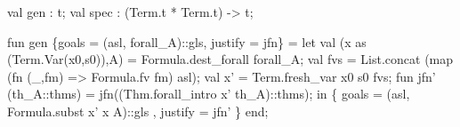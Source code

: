 
\nwenddocs{}\plusendmoddef\nwstartdeflinemarkup{}\nwenddeflinemarkup
val gen : t;
val spec : (Term.t * Term.t) -> t;
\nwendcode{}\nwdocspar

\nwenddocs{}\plusendmoddef\nwstartdeflinemarkup{}\nwenddeflinemarkup
fun gen \{goals = (asl, forall_A)::gls, justify = jfn\} =
  let
    val (x as (Term.Var(x0,s0)),A) = Formula.dest_forall forall_A;
    val fvs = List.concat (map (fn (_,fm) => Formula.fv fm) asl);
    val x' = Term.fresh_var x0 s0 fvs;
    fun jfn' (th_A::thms) = jfn((Thm.forall_intro x' th_A)::thms);
  in
    \{ goals = (asl, Formula.subst x' x A)::gls
    , justify = jfn' \}
  end;


